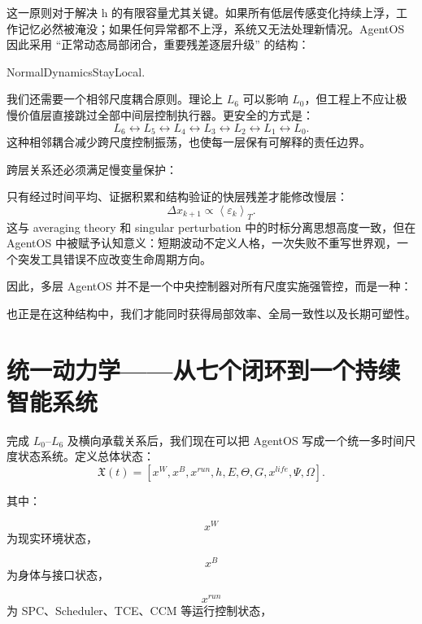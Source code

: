 这一原则对于解决 h 的有限容量尤其关键。如果所有低层传感变化持续上浮，工作记忆必然被淹没；如果任何异常都不上浮，系统又无法处理新情况。AgentOS 因此采用 ``正常动态局部闭合，重要残差逐层升级'' 的结构：
\begin{statementbox}
NormalDynamicsStayLocal.
\end{statementbox}

我们还需要一个相邻尺度耦合原则。理论上 $L_6$ 可以影响 $L_0$，但工程上不应让极慢价值层直接跳过全部中间层控制执行器。更安全的方式是：
\[
L_6
\leftrightarrow
L_5
\leftrightarrow
L_4
\leftrightarrow
L_3
\leftrightarrow
L_2
\leftrightarrow
L_1
\leftrightarrow
L_0.
\]
这种相邻耦合减少跨尺度控制振荡，也使每一层保有可解释的责任边界。

跨层关系还必须满足慢变量保护：
\begin{statementbox}
\centering
{}
\end{statementbox}
只有经过时间平均、证据积累和结构验证的快层残差才能修改慢层：
\[
\Delta x_{k+1}
\propto
\left\langle
\varepsilon_k
\right\rangle_T.
\]
这与 averaging theory 和 singular perturbation 中的时标分离思想高度一致，但在 AgentOS 中被赋予认知意义：短期波动不定义人格，一次失败不重写世界观，一个突发工具错误不应改变生命周期方向。

因此，多层 AgentOS 并不是一个中央控制器对所有尺度实施强管控，而是一种：
\begin{statementbox}
\centering
{}
\end{statementbox}
也正是在这种结构中，我们才能同时获得局部效率、全局一致性以及长期可塑性。

\section{统一动力学——从七个闭环到一个持续智能系统}

完成 $L_0$--$L_6$ 及横向承载关系后，我们现在可以把 AgentOS 写成一个统一多时间尺度状态系统。定义总体状态：
\[
\mathfrak X(t)
=
\left[
x^W,
x^B,
x^{run},
h,
E,
\Theta,
G,
x^{life},
\Psi,
\Omega
\right].
\]

其中：

\[
x^W
\]
为现实环境状态，

\[
x^B
\]
为身体与接口状态，

\[
x^{run}
\]
为 SPC、Scheduler、TCE、CCM 等运行控制状态，

